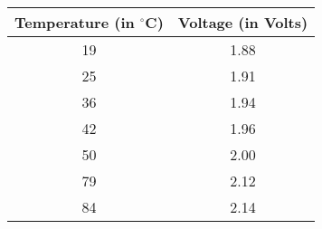 
\begin{center}
\begin{tabular}{|c|c|}
\hline
\textbf{Temperature (in $^{\circ}$C)} & \textbf{Voltage (in Volts)} \\ \hline
19      &   1.88 \\ \hline
25	    &   1.91 \\ \hline
36 		&   1.94 \\ \hline
42	    &   1.96 \\ \hline
50		&   2.00	 \\ \hline
79	    &   2.12 \\ \hline
84      &   2.14 \\ \hline
\end{tabular}
\end{center}
